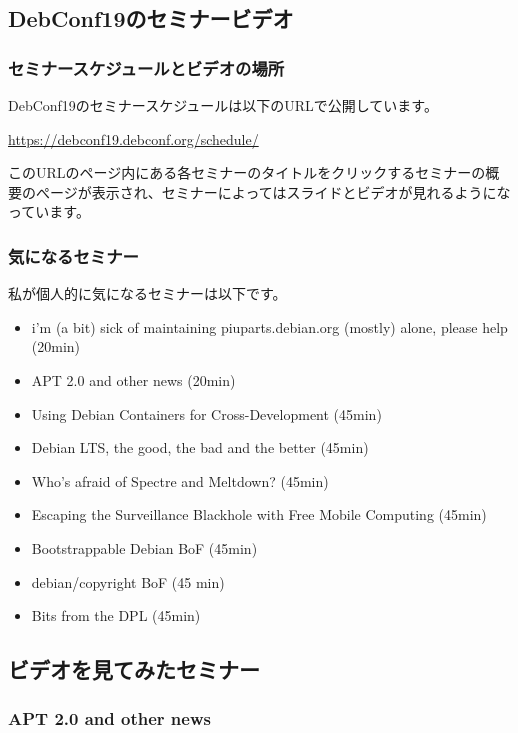 \documentclass[mingoth,a4paper]{jsarticle}
\begin{document}
\subsection{DebConf19のセミナービデオ}

\subsubsection{セミナースケジュールとビデオの場所}

DebConf19のセミナースケジュールは以下のURLで公開しています。

\url{https://debconf19.debconf.org/schedule/}

このURLのページ内にある各セミナーのタイトルをクリックするセミナーの概要のぺージが表示され、セミナーによってはスライドとビデオが見れるようになっています。


\subsubsection{気になるセミナー}

私が個人的に気になるセミナーは以下です。

\begin{itemize}
\item i'm (a bit) sick of maintaining piuparts.debian.org (mostly) alone, please help (20min)
\item APT 2.0 and other news (20min)
\item Using Debian Containers for Cross-Development (45min)
\item Debian LTS, the good, the bad and the better (45min)
\item Who's afraid of Spectre and Meltdown? (45min)
\item Escaping the Surveillance Blackhole with Free Mobile Computing (45min)
\item Bootstrappable Debian BoF (45min)
\item debian/copyright BoF (45 min)
\item Bits from the DPL (45min)
\end{itemize}


\subsection{ビデオを見てみたセミナー}

\subsubsection{APT 2.0 and other news}
\end{document}
